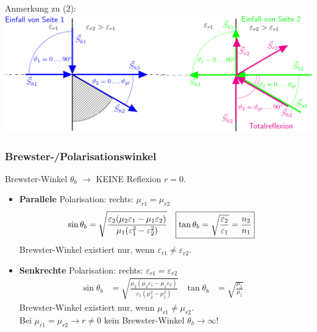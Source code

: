 Anmerkung zu (2):\\
\includegraphics[width=\columnwidth]{Figures/Grenzwinkel_Bild.png}

\subsubsection[Brewster-/Polarisationswinkel]{Brewster-/Polarisationswinkel}
Brewster-Winkel $ \theta_b $ $\rightarrow$ KEINE Reflexion $r=0$.
\begin{itemize}
	\item \textbf{Parallele} Polarisation: \quad rechts:
	$ \mu_{r1}=\mu_{r2} $
	\begin{align*}
		\sin\theta_b & = \sqrt{\frac{\varepsilon_2(\mu_2\varepsilon_1 - \mu_1\varepsilon_2)}{\mu_1(\varepsilon_1^2-\varepsilon_2^2)}} &
		\Aboxed{\tan\theta_b & = \sqrt{\frac{\varepsilon_2}{\varepsilon_1}} = \frac{n_2}{n_1}}&
	\end{align*}
		Brewster-Winkel existiert nur, wenn $ \varepsilon_{r1} \neq \varepsilon_{r2} $.
    \item \textbf{Senkrechte} Polarisation:  \quad rechts: $ \varepsilon_{r1} = \varepsilon_{r2} $
	\begin{align*}
		\sin\theta_b & = \sqrt{\frac{\mu_2(\mu_2\varepsilon_1 - \mu_1\varepsilon_2)}{\varepsilon_1(\mu_2^2-\mu_1^2)}}&
		\tan\theta_b & = \sqrt{\frac{\mu_2}{\mu_1}}&
	\end{align*}
	Brewster-Winkel existiert nur, wenn $ \mu_{r1} \neq \mu_{r2} $.\\
	Bei $ \mu_{r1}=\mu_{r2} \rightarrow r \neq 0$ \qquad kein Brewster-Winkel $\theta_b \rightarrow \infty$!
\end{itemize}

